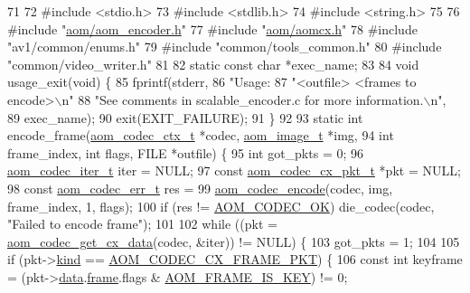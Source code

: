 \begin{DoxyCodeInclude}
71 
72 \textcolor{preprocessor}{#include <stdio.h>}
73 \textcolor{preprocessor}{#include <stdlib.h>}
74 \textcolor{preprocessor}{#include <string.h>}
75 
76 \textcolor{preprocessor}{#include "\hyperlink{aom__encoder_8h}{aom/aom\_encoder.h}"}
77 \textcolor{preprocessor}{#include "\hyperlink{aomcx_8h}{aom/aomcx.h}"}
78 \textcolor{preprocessor}{#include "av1/common/enums.h"}
79 \textcolor{preprocessor}{#include "common/tools\_common.h"}
80 \textcolor{preprocessor}{#include "common/video\_writer.h"}
81 
82 \textcolor{keyword}{static} \textcolor{keyword}{const} \textcolor{keywordtype}{char} *exec\_name;
83 
84 \textcolor{keywordtype}{void} usage\_exit(\textcolor{keywordtype}{void}) \{
85   fprintf(stderr,
86           \textcolor{stringliteral}{"Usage: %
87           \textcolor{stringliteral}{"<outfile> <frames to encode>\(\backslash\)n"}
88           \textcolor{stringliteral}{"See comments in scalable\_encoder.c for more information.\(\backslash\)n"},
89           exec\_name);
90   exit(EXIT\_FAILURE);
91 \}
92 
93 \textcolor{keyword}{static} \textcolor{keywordtype}{int} encode\_frame(\hyperlink{structaom__codec__ctx}{aom\_codec\_ctx\_t} *codec, \hyperlink{structaom__image}{aom\_image\_t} *img,
94                         \textcolor{keywordtype}{int} frame\_index, \textcolor{keywordtype}{int} flags, FILE *outfile) \{
95   \textcolor{keywordtype}{int} got\_pkts = 0;
96   \hyperlink{group__codec_gadf9e173c9e02788a9999399edab20a02}{aom\_codec\_iter\_t} iter = NULL;
97   \textcolor{keyword}{const} \hyperlink{structaom__codec__cx__pkt}{aom\_codec\_cx\_pkt\_t} *pkt = NULL;
98   \textcolor{keyword}{const} \hyperlink{group__codec_gaaae61e0f8663e6137f1e228757248e7c}{aom\_codec\_err\_t} res =
99       \hyperlink{group__encoder_ga6f4a777de5389771e783df7ff1f116d4}{aom\_codec\_encode}(codec, img, frame\_index, 1, flags);
100   \textcolor{keywordflow}{if} (res != \hyperlink{group__codec_ggaaae61e0f8663e6137f1e228757248e7caf145dc2f86014a08ebad36ac2b140001}{AOM\_CODEC\_OK}) die\_codec(codec, \textcolor{stringliteral}{"Failed to encode frame"});
101 
102   \textcolor{keywordflow}{while} ((pkt = \hyperlink{group__encoder_gaedc4c56b60d4217677cb561066360884}{aom\_codec\_get\_cx\_data}(codec, &iter)) != NULL) \{
103     got\_pkts = 1;
104 
105     \textcolor{keywordflow}{if} (pkt->\hyperlink{structaom__codec__cx__pkt_a11e586120c689ece9a7690e72ff384be}{kind} == \hyperlink{group__encoder_ggafeb69da4a9649a54e805f59c26d8dfeda793165d0f219812342f69d5fd9b2b9c8}{AOM\_CODEC\_CX\_FRAME\_PKT}) \{
106       \textcolor{keyword}{const} \textcolor{keywordtype}{int} keyframe = (pkt->\hyperlink{structaom__codec__cx__pkt_afb379cd4bfa7692d1d6e85f4e4b2b410}{data}.\hyperlink{structaom__codec__cx__pkt_a4180a6ae59b0d295bc915d4689df4cb0}{frame}.flags & \hyperlink{group__encoder_gaf4a58f123913a5eef0a3796f0619e5f3}{AOM\_FRAME\_IS\_KEY}) != 0;
}
\end{DoxyCodeInclude}
